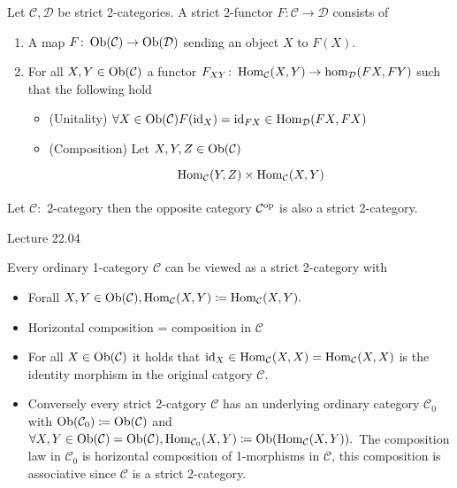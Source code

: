 \begin{defi}
	Let $ \mathcal{ C } , \mathcal{ D } $  be strict 2-categories.
	A strict 2-functor $ F \colon \mathcal{ C } \to \mathcal{ D } $ consists of 
	\begin{enumerate}
		\item 
		A map $ F \colon \operatorname{Ob} ( \mathcal{ C } ) \to \operatorname{Ob} ( \mathcal{ D } )$  sending an object $ X $ to $ F ( X ) $.
		
		\item 
		For all $ X , Y \in \operatorname{Ob} ( \mathcal{ C } ) $ a functor $ F_{XY} \colon \operatorname{Hom}_{ \mathcal{ C } } ( X , Y ) \to \hom_{ \mathcal{ D }} ( F X , F Y ) $ such that the following hold 
		\begin{itemize}
			\item 
			(Unitality)
			$ \forall X \in \operatorname{Ob} ( \mathcal{ C } ) F ( \operatorname{id}_X ) = \operatorname{id}_{ FX } \in \operatorname{Hom}_{ \mathcal{ D } } ( FX, FX )$
				
			\item 
			(Composition)
			Let $ X, Y , Z \in \operatorname{Ob} ( \mathcal{C}) $
			\[
			\begin{tikzcd}
				\Hom_{ \mathcal{ C } } ( Y, Z ) \times \Hom_{ \mathcal{ C } }( X , Y )
			\end{tikzcd}
			\]
		\end{itemize}
	\end{enumerate}
	Let $ \mathcal{ C } \colon $ 2-category then the opposite category $ \mathcal{ C }^{ \operatorname{op} } $ is also a strict 2-category.
\end{defi}

Lecture 22.04

\begin{rmk}
	Every ordinary 1-category $ \mathcal{ C } $  can be viewed as a strict 2-category with 
	\begin{itemize}
		\item 
		Forall $ X , Y \in \operatorname{Ob} ( \mathcal{ C } ) , \operatorname{Hom}_{\mathcal{ C } } ( X , Y ) \coloneqq \operatorname{Hom}_{ \mathcal{C } }  ( X , Y ).$
		
		\item 
		Horizontal composition = composition in $ \mathcal{ C } $
		
		\item 
		For all $ X \in \operatorname{Ob} ( \mathcal{ C } )\label{key} $ it holds that $ \operatorname{id}_X \in \operatorname{Hom}_ { \mathcal{ C } } ( X , X ) = \operatorname{Hom}_{ \mathcal{ C } } ( X , X ) $ is the identity morphism in the original catgory $ \mathcal{ C }.$
			
		\item 
		Conversely every strict 2-catgory $ \mathcal{ C } $ has an underlying ordinary category $ \mathcal{ C }_0 $ with $ \operatorname{Ob} ( \mathcal{ C }_0 ) \coloneqq \operatorname{Ob} ( \mathcal{ C } )$
		and $ \forall X , Y \in \operatorname{Ob} ( \mathcal{ C } ) = \operatorname{Ob} ( \mathcal{ C } ), \operatorname{Hom}_{ \mathcal{ C }_0 } ( X , Y  ) \coloneqq \operatorname{Ob} ( \operatorname{Hom}_{ \mathcal{ C } }( X ,Y )).$
		The composition law in $ \mathcal{ C }_0 $ is horizontal composition of 1-morphisms in $ \mathcal{ C } $, this composition is associative since $ \mathcal{ C } $ is a strict 2-category.  
	\end{itemize}
\end{rmk}

